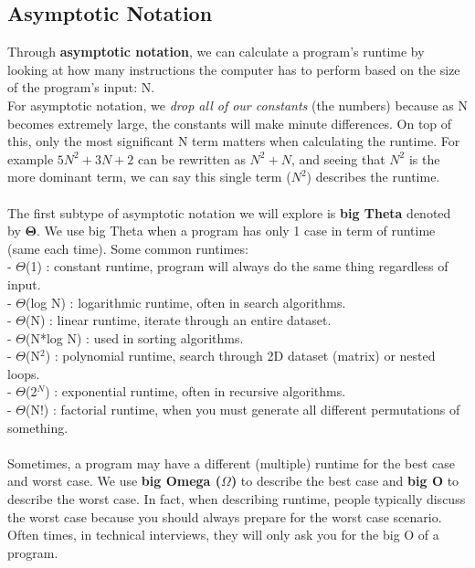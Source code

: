 \documentclass[11pt, a4paper]{article}
\begin{document}
\begin{spacing}{1.1}
	\subsection{Asymptotic Notation}
	Through \textbf{asymptotic notation}, we can calculate a program’s runtime by looking at how many instructions the computer has to perform based on the size of the program’s input: N. \vspace*{1.5mm} \\
	For asymptotic notation, we \textit{drop all of our constants} (the numbers) because as N becomes extremely large, the constants will make minute differences. On top of this, only the most significant N term matters when calculating the runtime. For example $5N^2 + 3N + 2$ can be rewritten as $N^2 + N$, and seeing that $N^2$ is the more dominant term, we can say this single term ($N^2$) describes the runtime. \\~\\
	The first subtype of asymptotic notation we will explore is \textbf{big Theta} denoted by $\mathbf{\Theta}$. We use big Theta when a program has only 1 case in term of runtime (same each time). Some common runtimes:\\
	\hspace*{3mm} - $\Theta$(1) : constant runtime, program will always do the same thing regardless of input. \\
	\hspace*{3mm} - $\Theta$(log N) : logarithmic runtime, often in search algorithms. \\
	\hspace*{3mm} - $\Theta$(N) : linear runtime, iterate through an entire dataset. \\
	\hspace*{3mm} - $\Theta$(N*log N) : used  in sorting algorithms. \\
	\hspace*{3mm} - $\Theta$(N$^2$) : polynomial runtime, search through 2D dataset (matrix) or nested loops. \\
	\hspace*{3mm} - $\Theta$(2$^N$) : exponential runtime, often in recursive algorithms. \\
	\hspace*{3mm} - $\Theta$(N!) : factorial runtime, when you must generate all different permutations of something. \\~\\
	Sometimes, a program may have a different (multiple) runtime for the best case and worst case. We use \textbf{big Omega ($\Omega$)} to describe the best case and \textbf{big O} to describe the worst case. In fact, when describing runtime, people typically discuss the worst case because you should always prepare for the worst case scenario. Often times, in technical interviews, they will only ask you for the big O of a program. \\~\\

\end{spacing}
\end{document}
